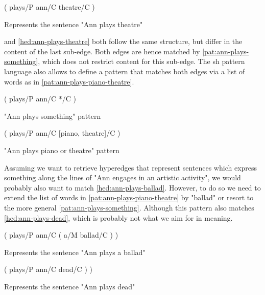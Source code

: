 \documentclass[11pt, numbers=noenddot]{scrreprt}
\begin{document}
\begin{hedge}[h!]
  \normalfont\sffamily
  \centering
  ( plays/P ann/C theatre/C ) 
  \caption{Represents the sentence "Ann plays theatre"}
  \label{hed:ann-plays-theatre}
\end{hedge}
  


 and \cref{hed:ann-plays-theatre} both follow the same structure, but differ in the content of the last sub-edge. Both edges are hence matched by \cref{pat:ann-plays-something}, which does not restrict content for this sub-edge. The \gls{sh} pattern language also allows to define a pattern that matches both edges via a list of words as in \cref{pat:ann-plays-piano-theatre}. 

\begin{pattern}[h!]
  \normalfont\sffamily
  \centering
  ( plays/P ann/C */C )
  \caption{"Ann plays something" pattern}
  \label{pat:ann-plays-something}
\end{pattern}

\begin{pattern}[h!]
  \normalfont\sffamily
  \centering
  ( plays/P ann/C [piano, theatre]/C )
  \caption{"Ann plays piano or theatre" pattern}
  \label{pat:ann-plays-piano-theatre}
\end{pattern}

Assuming we want to retrieve hyperedges that represent sentences which express something along the lines of "Ann engages in an artistic activity", we would probably also want to match \cref{hed:ann-plays-ballad}. However, to do so we need to extend the list of words in \cref{pat:ann-plays-piano-theatre} by "ballad" or resort to the more general \cref{pat:ann-plays-something}. Although this pattern also matches \cref{hed:ann-plays-dead}, which is probably not what we aim for in meaning. 

\begin{hedge}[h!]
  \normalfont\sffamily
  \centering
  ( plays/P ann/C ( a/M ballad/C ) ) 
  \caption{Represents the sentence "Ann plays a ballad"}
  \label{hed:ann-plays-ballad}
\end{hedge}

\begin{hedge}[h!]
  \normalfont\sffamily
  \centering
   ( plays/P ann/C dead/C ) )
  \caption{Represents the sentence "Ann plays dead"}
  \label{hed:ann-plays-dead}
\end{hedge}

%
\end{document}

